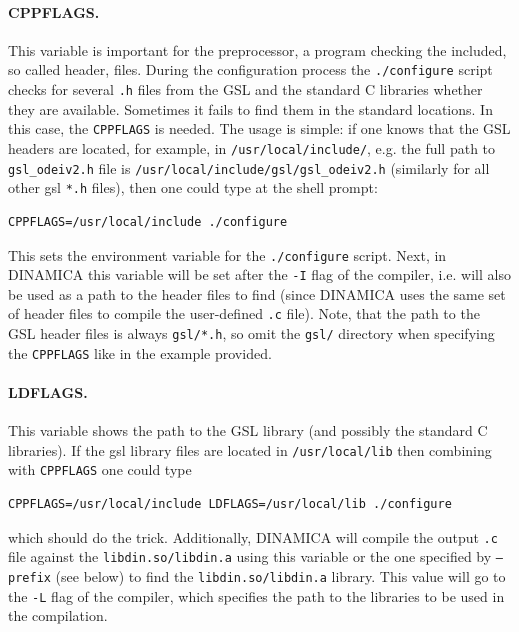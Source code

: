 \documentclass[11pt,a4paper]{article}
\begin{document}
\paragraph{CPPFLAGS.}
\label{sec:cppflags}

This variable is important for the preprocessor, a program checking the included, so
called header, files. During the configuration process the \texttt{./configure}
script checks for several \texttt{.h} files from the GSL and the standard C libraries
whether they are available. Sometimes it fails to find them in the standard
locations. In this case, the \texttt{CPPFLAGS} is needed. The usage is simple: if one
knows that the GSL headers are located, for example, in \texttt{/usr/local/include/},
e.g. the full path to \texttt{gsl\_odeiv2.h} file is\newline
\texttt{/usr/local/include/gsl/gsl\_odeiv2.h} (similarly for all other gsl
\texttt{*.h} files), then one could type at the shell prompt:

\begin{verbatim}
CPPFLAGS=/usr/local/include ./configure
\end{verbatim}
This sets the environment variable for the \texttt{./configure} script.  Next, in
DINAMICA this variable will be set after the \texttt{-I} flag of the compiler, i.e.
will also be used as a path to the header files to find (since DINAMICA uses the same
set of header files to compile the user-defined \texttt{.c} file). Note, that the
path to the GSL header files is always \texttt{gsl/*.h}, so omit the \texttt{gsl/}
directory when specifying the \texttt{CPPFLAGS} like in the example provided.

\paragraph{LDFLAGS.}
\label{sec:ldflags}

This variable shows the path to the GSL library (and possibly the standard C
libraries). If the gsl library files are located in \texttt{/usr/local/lib} then
combining with \texttt{CPPFLAGS} one could type

\begin{verbatim}
CPPFLAGS=/usr/local/include LDFLAGS=/usr/local/lib ./configure
\end{verbatim}
which should do the trick. Additionally, DINAMICA will compile the output \texttt{.c}
file against the \texttt{libdin.so/libdin.a} using this variable or the one specified
by \texttt{--prefix} (see below) to find the \texttt{libdin.so/libdin.a}
library. This value will go to the \texttt{-L} flag of the compiler, which specifies
the path to the libraries to be used in the compilation.
\end{document}
